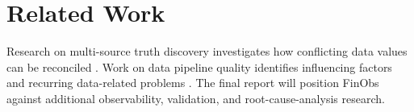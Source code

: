 \section{Related Work}
\label{sec:related}
Research on multi-source truth discovery investigates how conflicting data values
can be reconciled \cite{li2012truth}. Work on data pipeline quality identifies
influencing factors and recurring data-related problems \cite{foidl2023pipeline}.
The final report will position FinObs against additional observability,
validation, and root-cause-analysis research.
